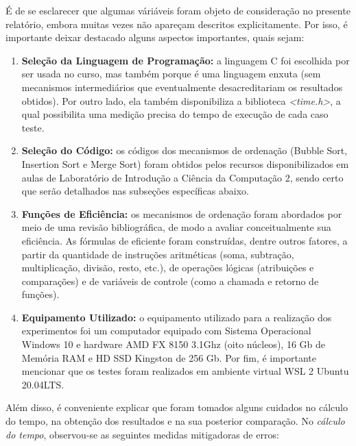 \documentclass[a4paper, 12pt]{article}
\begin{document}
É de se esclarecer que algumas váriáveis foram objeto de consideração no presente relatório, embora muitas vezes não apareçam descritos explicitamente. Por isso, é importante deixar destacado alguns aspectos importantes, quais sejam:
\begin{enumerate}
    \item \textbf{Seleção da Linguagem de Programação:} a linguagem C foi escolhida por ser usada no curso, mas também porque é uma linguagem enxuta (sem mecanismos intermediários que eventualmente desacreditariam os resultados obtidos). Por outro lado, ela também disponibiliza a biblioteca \textit{<time.h>}, a qual possibilita uma medição precisa do tempo de execução de cada caso teste.
    \item \textbf{Seleção do Código:} os códigos dos mecanismos de ordenação (Bubble Sort, Insertion Sort e Merge Sort) foram obtidos pelos recursos disponibilizados em aulas de Laboratório de Introdução a Ciência da Computação 2, sendo certo que serão detalhados nas subseções específicas abaixo.
    \item \textbf{Funções de Eficiência:} os mecanismos de ordenação foram abordados por meio de uma revisão bibliográfica, de modo a avaliar conceitualmente sua eficiência. As fórmulas de eficiente foram construídas, dentre outros fatores, a partir da quantidade de instruções aritméticas (soma, subtração, multiplicação, divisão, resto, etc.), de operações lógicas (atribuições e comparações) e de variáveis de controle (como a chamada e retorno de funções).
    \item \textbf{Equipamento Utilizado:} o equipamento utilizado para a realização dos experimentos foi um computador equipado com Sistema Operacional Windows 10 e hardware AMD FX 8150 3.1Ghz (oito núcleos), 16 Gb de Memória RAM e HD SSD Kingston de 256 Gb. Por fim, é importante mencionar que os testes foram realizados em ambiente virtual WSL 2 Ubuntu 20.04LTS.
\end{enumerate}

Além disso, é conveniente explicar que foram tomados alguns cuidados no cálculo do tempo, na obtenção dos resultados e na sua posterior comparação. No \textit{cálculo do tempo}, observou-se as seguintes medidas mitigadoras de erros:
\end{document}
